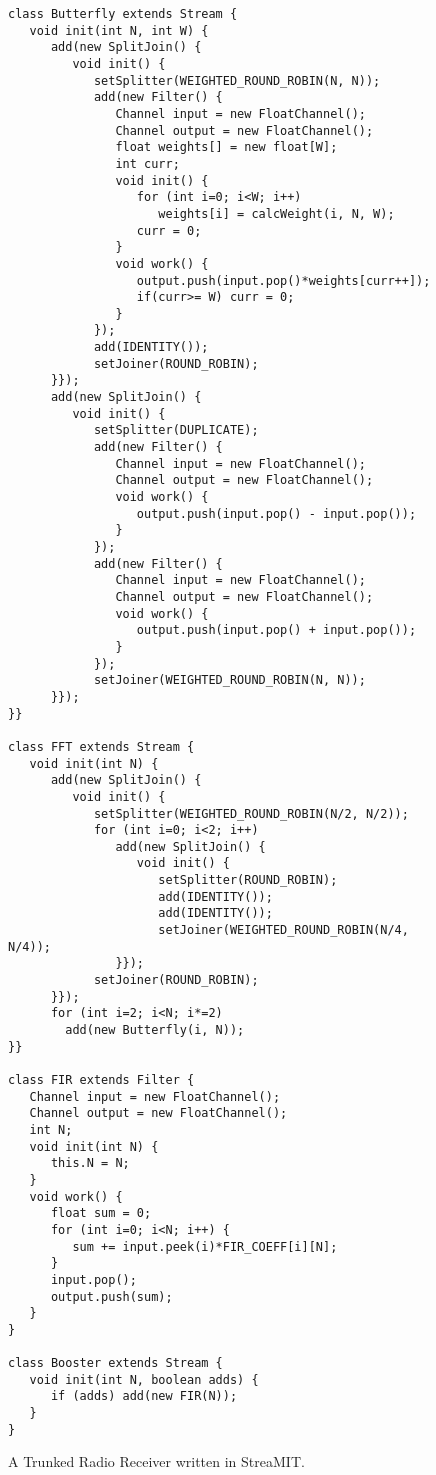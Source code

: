 \clearpage

\begin{figure}[h]
\scriptsize
\begin{verbatim}
class Butterfly extends Stream {
   void init(int N, int W) {
      add(new SplitJoin() {
         void init() {
            setSplitter(WEIGHTED_ROUND_ROBIN(N, N));
            add(new Filter() {
               Channel input = new FloatChannel();
               Channel output = new FloatChannel();
               float weights[] = new float[W];
               int curr;
               void init() {
                  for (int i=0; i<W; i++)
                     weights[i] = calcWeight(i, N, W);
                  curr = 0;
               }
               void work() {
                  output.push(input.pop()*weights[curr++]);
                  if(curr>= W) curr = 0;
               }    
            });
            add(IDENTITY());
            setJoiner(ROUND_ROBIN);
      }});
      add(new SplitJoin() {
         void init() {
            setSplitter(DUPLICATE);
            add(new Filter() {   
               Channel input = new FloatChannel();
               Channel output = new FloatChannel();
               void work() {
                  output.push(input.pop() - input.pop());
               }
            });
            add(new Filter() {   
               Channel input = new FloatChannel();
               Channel output = new FloatChannel();
               void work() {
                  output.push(input.pop() + input.pop());
               }
            });
            setJoiner(WEIGHTED_ROUND_ROBIN(N, N));
      }});
}}

class FFT extends Stream {
   void init(int N) {
      add(new SplitJoin() {
         void init() {
            setSplitter(WEIGHTED_ROUND_ROBIN(N/2, N/2));
            for (int i=0; i<2; i++) 
               add(new SplitJoin() {
                  void init() {
                     setSplitter(ROUND_ROBIN);
                     add(IDENTITY());
                     add(IDENTITY());
                     setJoiner(WEIGHTED_ROUND_ROBIN(N/4, N/4));
               }});
            setJoiner(ROUND_ROBIN);
      }});
      for (int i=2; i<N; i*=2)
        add(new Butterfly(i, N));
}}

class FIR extends Filter {
   Channel input = new FloatChannel();
   Channel output = new FloatChannel();           
   int N;
   void init(int N) {
      this.N = N;
   }
   void work() {
      float sum = 0;
      for (int i=0; i<N; i++) {
         sum += input.peek(i)*FIR_COEFF[i][N];
      }
      input.pop();
      output.push(sum);
   }
}

class Booster extends Stream {
   void init(int N, boolean adds) {
      if (adds) add(new FIR(N));
   }
}
\end{verbatim}
\vspace{-12pt}
\caption{\protect\small A Trunked Radio Receiver written in StreaMIT.
\protect\label{fig:radiocode}}
\vspace{-12pt}
\end{figure}

